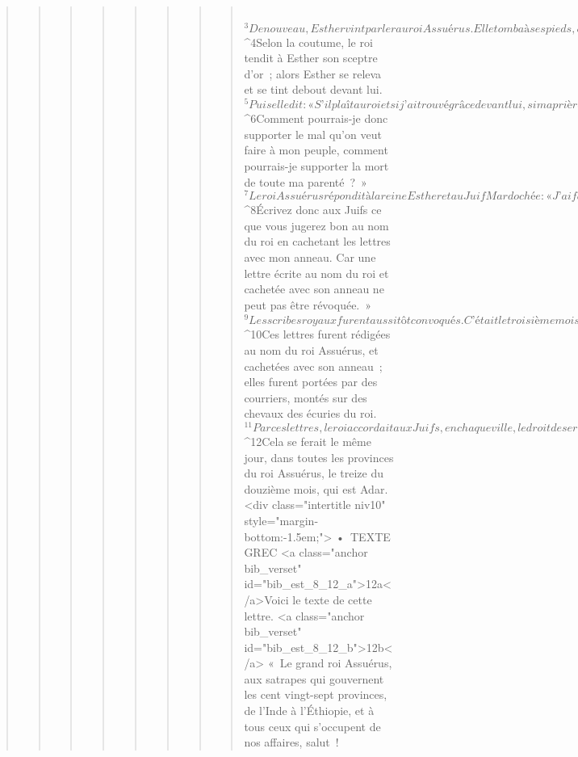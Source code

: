 \begin{verse}
\begin{verse}
\begin{verse}
\begin{verse}
\begin{verse}
\begin{verse}
\begin{verse}
\begin{verse}
         
${}^{3}De nouveau, Esther vint parler au roi Assuérus. Elle tomba à ses pieds, en pleurant, et elle le supplia d’écarter le malheur préparé par Amane, et tous les affreux projets qu’il avait formés contre les Juifs. 
${}^{4}Selon la coutume, le roi tendit à Esther son sceptre d’or ; alors Esther se releva et se tint debout devant lui. 
${}^{5}Puis elle dit : « S’il plaît au roi et si j’ai trouvé grâce devant lui, si ma prière ne lui paraît pas déplacée, si je suis bien vue à ses yeux, je le supplie de révoquer par de nouvelles lettres celles qu’a envoyées Amane, fils de Hamdata, du pays d’Agag, ces lettres qui ordonnaient de faire périr les Juifs dans toutes les provinces du royaume. 
${}^{6}Comment pourrais-je donc supporter le mal qu’on veut faire à mon peuple, comment pourrais-je supporter la mort de toute ma parenté ? » 
${}^{7}Le roi Assuérus répondit à la reine Esther et au Juif Mardochée : « J’ai fait cadeau à Esther de la maison d’Amane, et lui, on l’a pendu à la potence parce qu’il avait voulu porter la main sur les Juifs. 
${}^{8}Écrivez donc aux Juifs ce que vous jugerez bon au nom du roi en cachetant les lettres avec mon anneau. Car une lettre écrite au nom du roi et cachetée avec son anneau ne peut pas être révoquée. »
${}^{9}Les scribes royaux furent aussitôt convoqués. C’était le troisième mois, le mois de Sivane, le vingt-troisième jour. Sur l’ordre de Mardochée, ils écrivirent aux Juifs, aux satrapes, aux gouverneurs et aux grands officiers des provinces, depuis l’Inde jusqu’à l’Éthiopie – cent vingt-sept provinces –, à chaque province selon son écriture, et à chaque peuple selon sa langue, aux Juifs aussi selon leur écriture et selon leur langue. 
${}^{10}Ces lettres furent rédigées au nom du roi Assuérus, et cachetées avec son anneau ; elles furent portées par des courriers, montés sur des chevaux des écuries du roi. 
${}^{11}Par ces lettres, le roi accordait aux Juifs, en chaque ville, le droit de se rassembler, de mettre leur vie en sécurité, et celui d’exterminer, de tuer, de faire périr tous les gens armés des peuples ou des provinces qui voudraient les attaquer, y compris les enfants et les femmes, et celui de piller leurs biens. 
${}^{12}Cela se ferait le même jour, dans toutes les provinces du roi Assuérus, le treize du douzième mois, qui est Adar.
      <div class="intertitle niv10" style="margin-bottom:-1.5em;">
        • TEXTE GREC
      <a class="anchor bib_verset" id="bib_est_8_12_a">12a</a>Voici le texte de cette lettre. <a class="anchor bib_verset" id="bib_est_8_12_b">12b</a> « Le grand roi Assuérus, aux satrapes qui gouvernent les cent vingt-sept provinces, de l’Inde à l’Éthiopie, et à tous ceux qui s’occupent de nos affaires, salut !

\end{verse}
\end{verse}
\end{verse}
\end{verse}
\end{verse}
\end{verse}
\end{verse}
\end{verse}
